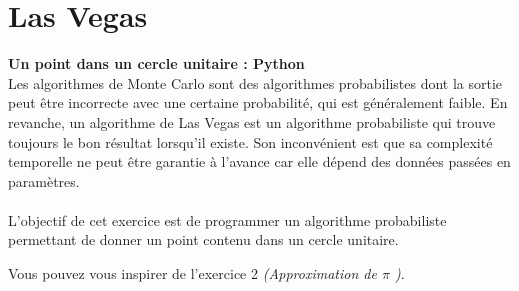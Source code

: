 \begin{Exercice}[15 minutes]
    \begin{solution}
        
    \end{solution}
\end{Exercice}

\newpage
\section{Las Vegas}

\begin{Exercice}[10 minutes]\textbf{Un point dans un cercle unitaire : Python} \optionnel\\
    Les algorithmes de Monte Carlo sont des algorithmes probabilistes dont la sortie peut être incorrecte avec une certaine probabilité, qui est généralement faible. En revanche, un algorithme de Las Vegas est un algorithme probabiliste qui trouve toujours le bon résultat lorsqu'il existe. Son inconvénient est que sa complexité temporelle ne peut être garantie à l'avance car elle dépend des données passées en paramètres.\\ \\
    L'objectif de cet exercice est de programmer un algorithme probabiliste permettant de donner un point contenu dans un cercle unitaire. 
    
    \begin{conseil}
       Vous pouvez vous inspirer de l'exercice 2 \textit{(Approximation de $\pi$ )}.
    \end{conseil}
    \begin{solution}
     
    \end{solution}
    \end{Exercice}

